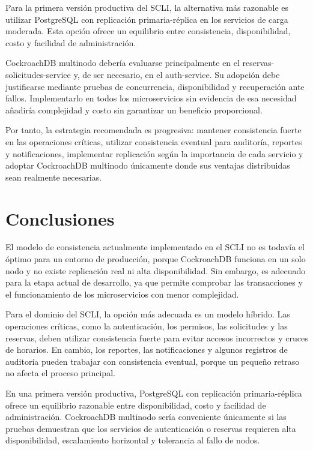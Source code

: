 \documentclass[conference]{IEEEtran}
\begin{document}
Para la primera versión productiva del SCLI, la alternativa más razonable es utilizar PostgreSQL con replicación primaria-réplica en los servicios de carga moderada. Esta opción ofrece un equilibrio entre consistencia, disponibilidad, costo y facilidad de administración.

CockroachDB multinodo debería evaluarse principalmente en el reservas-solicitudes-service y, de ser necesario, en el auth-service. Su adopción debe justificarse mediante pruebas de concurrencia, disponibilidad y recuperación ante fallos. Implementarlo en todos los microservicios sin evidencia de esa necesidad añadiría complejidad y costo sin garantizar un beneficio proporcional.

Por tanto, la estrategia recomendada es progresiva: mantener consistencia fuerte en las operaciones críticas, utilizar consistencia eventual para auditoría, reportes y notificaciones, implementar replicación según la importancia de cada servicio y adoptar CockroachDB multinodo únicamente donde sus ventajas distribuidas sean realmente necesarias.

\section{Conclusiones}
El modelo de consistencia actualmente implementado en el SCLI no es todavía el óptimo para un entorno de producción, porque CockroachDB funciona en un solo nodo y no existe replicación real ni alta disponibilidad. Sin embargo, es adecuado para la etapa actual de desarrollo, ya que permite comprobar las transacciones y el funcionamiento de los microservicios con menor complejidad.

Para el dominio del SCLI, la opción más adecuada es un modelo híbrido. Las operaciones críticas, como la autenticación, los permisos, las solicitudes y las reservas, deben utilizar consistencia fuerte para evitar accesos incorrectos y cruces de horarios. En cambio, los reportes, las notificaciones y algunos registros de auditoría pueden trabajar con consistencia eventual, porque un pequeño retraso no afecta el proceso principal.

En una primera versión productiva, PostgreSQL con replicación primaria-réplica ofrece un equilibrio razonable entre disponibilidad, costo y facilidad de administración. CockroachDB multinodo sería conveniente únicamente si las pruebas demuestran que los servicios de autenticación o reservas requieren alta disponibilidad, escalamiento horizontal y tolerancia al fallo de nodos.
\end{document}
